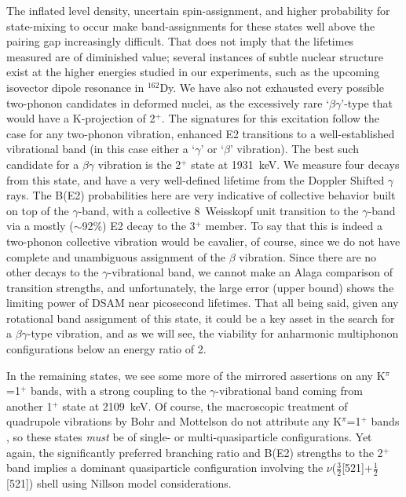 The inflated level density, uncertain spin-assignment, and higher probability for state-mixing to occur \cite{Casten_text} make band-assignments for these states well above the pairing gap increasingly difficult. That does not imply that the lifetimes measured are of diminished value; several instances of subtle nuclear structure exist at the higher energies studied in our experiments, such as the upcoming isovector dipole resonance in $^{162}$Dy. We have also not exhausted every possible two-phonon candidates in deformed nuclei, as the excessively rare `$\beta\gamma$'-type that would have a K-projection of 2$^+$. The signatures for this excitation follow the case for any two-phonon vibration, enhanced E2 transitions to a well-established vibrational band (in this case either a `$\gamma$' or `$\beta$' vibration). The best such candidate for a $\beta\gamma$ vibration is the 2$^+$ state at 1931~keV. We measure four decays from this state, and have a very well-defined lifetime from the Doppler Shifted $\gamma$ rays. The B(E2) probabilities here are very indicative of collective behavior built on top of the $\gamma$-band, with a collective 8~Weisskopf unit transition to the $\gamma$-band via a mostly ($\sim$92\%) E2 decay to the 3$^+$ member. To say that this is indeed a two-phonon collective vibration would be cavalier, of course, since we do not have complete and unambiguous assignment of the $\beta$ vibration. Since there are no other decays to the $\gamma$-vibrational band, we cannot make an Alaga comparison of transition strengths, and unfortunately, the large error (upper bound) shows the limiting power of DSAM near picosecond lifetimes. That all being said, given any rotational band assignment of this state, it could be a key asset in the search for a $\beta\gamma$-type vibration, and as we will see, the viability for anharmonic multiphonon configurations below an energy ratio of 2.

In the remaining states, we see some more of the mirrored assertions on any K$^\pi$=1$^+$ bands, with a strong coupling to the $\gamma$-vibrational band coming from another 1$^+$ state at 2109~keV. Of course, the macroscopic treatment of quadrupole vibrations by Bohr and Mottelson do not attribute any K$^\pi$=1$^+$ bands \cite{BohrMott_text}, so these states \textit{must} be of single- or multi-quasiparticle configurations. Yet again, the significantly preferred branching ratio and B(E2) strengths to the 2$^+$ band implies a dominant quasiparticle configuration involving the $\nu$($\frac{3}{2}$[521]+$\frac{1}{2}$[521]) shell using Nillson model considerations.

